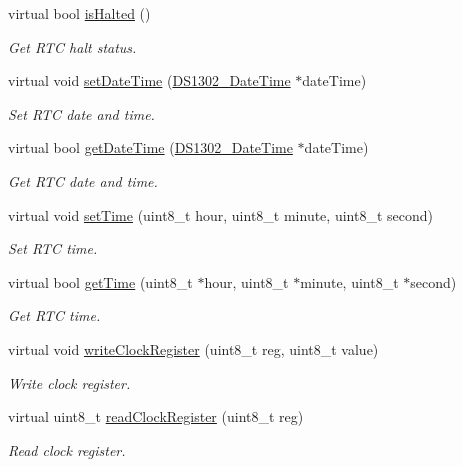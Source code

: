\begin{DoxyCompactItemize}
virtual bool \hyperlink{class_d_s1302_a7a11050b7379f8d23083fec59f5f7d50}{is\+Halted} ()
\begin{DoxyCompactList}\small\item\em Get R\+TC halt status. \end{DoxyCompactList}\item 
virtual void \hyperlink{class_d_s1302_af947e2773a2c049ff9c1ca975c4f00a0}{set\+Date\+Time} (\hyperlink{struct_d_s1302___date_time}{D\+S1302\+\_\+\+Date\+Time} $\ast$date\+Time)
\begin{DoxyCompactList}\small\item\em Set R\+TC date and time. \end{DoxyCompactList}\item 
virtual bool \hyperlink{class_d_s1302_a6ad83d1a3774ade1257d75155c6a746c}{get\+Date\+Time} (\hyperlink{struct_d_s1302___date_time}{D\+S1302\+\_\+\+Date\+Time} $\ast$date\+Time)
\begin{DoxyCompactList}\small\item\em Get R\+TC date and time. \end{DoxyCompactList}\item 
virtual void \hyperlink{class_d_s1302_aca174e400c6288e75a13373e39cb74e2}{set\+Time} (uint8\+\_\+t hour, uint8\+\_\+t minute, uint8\+\_\+t second)
\begin{DoxyCompactList}\small\item\em Set R\+TC time. \end{DoxyCompactList}\item 
virtual bool \hyperlink{class_d_s1302_a03f38bfe4805e6a1bf515b7a0d5f4461}{get\+Time} (uint8\+\_\+t $\ast$hour, uint8\+\_\+t $\ast$minute, uint8\+\_\+t $\ast$second)
\begin{DoxyCompactList}\small\item\em Get R\+TC time. \end{DoxyCompactList}\item 
virtual void \hyperlink{class_d_s1302_a30a2d4d56c559b266b98a7a3920288de}{write\+Clock\+Register} (uint8\+\_\+t reg, uint8\+\_\+t value)
\begin{DoxyCompactList}\small\item\em Write clock register. \end{DoxyCompactList}\item 
virtual uint8\+\_\+t \hyperlink{class_d_s1302_a8856bd9b089bc6aec65033b48c3a5688}{read\+Clock\+Register} (uint8\+\_\+t reg)
\begin{DoxyCompactList}\small\item\em Read clock register. \end{DoxyCompactList}\item 

\end{DoxyCompactItemize}
